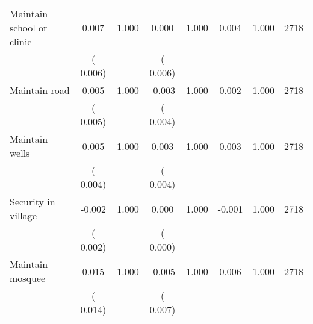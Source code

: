 \begin{tabular}{l*{7}{c}}
 Maintain school or clinic       &              0.007       &        1.000  &              0.000       &        1.000  &              0.004       &              1.000 &  2718 \\ 
                       &       (       0.006)             &                               &       (       0.006)                     &                               &                                               &                                &                      \\ 

 Maintain road       &              0.005       &        1.000  &             -0.003       &        1.000  &              0.002       &              1.000 &  2718 \\ 
                       &       (       0.005)             &                               &       (       0.004)                     &                               &                                               &                                &                      \\ 

 Maintain wells       &              0.005       &        1.000  &              0.003       &        1.000  &              0.003       &              1.000 &  2718 \\ 
                       &       (       0.004)             &                               &       (       0.004)                     &                               &                                               &                                &                      \\ 

 Security in village       &             -0.002       &        1.000  &              0.000       &        1.000  &             -0.001       &              1.000 &  2718 \\ 
                       &       (       0.002)             &                               &       (       0.000)                     &                               &                                               &                                &                      \\ 

 Maintain mosquee       &              0.015       &        1.000  &             -0.005       &        1.000  &              0.006       &              1.000 &  2718 \\ 
                       &       (       0.014)             &                               &       (       0.007)                     &                               &                                               &                                &                      \\ 


\end{tabular}
